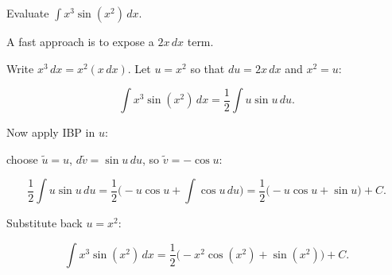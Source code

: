 \begin{examplebox}[title={Worked Example: When substitution beats IBP}]

Evaluate $\displaystyle \int x^3\sin(x^2)\,dx$.

A fast approach is to expose a $2x\,dx$ term.

Write $x^3\,dx=x^2(x\,dx)$. Let $u=x^2$ so that $du=2x\,dx$ and $x^2=u$:

\[
\int x^3\sin(x^2)\,dx
=\frac12\int u\sin u\,du.
\]

Now apply IBP in $u$:

choose $\tilde u=u$, $d\tilde v=\sin u\,du$, so $\tilde v=-\cos u$:

\[
\frac12\int u\sin u\,du
=\frac12\Big(-u\cos u+\int \cos u\,du\Big)
=\frac12\big(-u\cos u+\sin u\big)+C.
\]

Substitute back $u=x^2$:

\[
\int x^3\sin(x^2)\,dx
=\frac12\big(-x^2\cos(x^2)+\sin(x^2)\big)+C.
\]

\end{examplebox}

